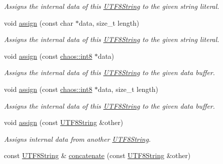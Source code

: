 \begin{DoxyCompactItemize}
\begin{DoxyCompactList}\small\item\em Assigns the internal data of this \hyperlink{classchaos_1_1str_1_1_u_t_f8_string}{U\-T\-F8\-String} to the given string literal. \end{DoxyCompactList}\item 
void \hyperlink{classchaos_1_1str_1_1_u_t_f8_string_a631f935a5b85214a2fa662a78f5693aa}{assign} (const char $\ast$data, size\-\_\-t length)
\begin{DoxyCompactList}\small\item\em Assigns the internal data of this \hyperlink{classchaos_1_1str_1_1_u_t_f8_string}{U\-T\-F8\-String} to the given string literal. \end{DoxyCompactList}\item 
void \hyperlink{classchaos_1_1str_1_1_u_t_f8_string_a861874ab4bff725c9c10b20a14533221}{assign} (const \hyperlink{namespacechaos_a56015674cfe4ad1fc583c3da6c724d8a}{chaos\-::int8} $\ast$data)
\begin{DoxyCompactList}\small\item\em Assigns the internal data of this \hyperlink{classchaos_1_1str_1_1_u_t_f8_string}{U\-T\-F8\-String} to the given data buffer. \end{DoxyCompactList}\item 
void \hyperlink{classchaos_1_1str_1_1_u_t_f8_string_a399d279254a826c36ec8815122ea1883}{assign} (const \hyperlink{namespacechaos_a56015674cfe4ad1fc583c3da6c724d8a}{chaos\-::int8} $\ast$data, size\-\_\-t length)
\begin{DoxyCompactList}\small\item\em Assigns the internal data of this \hyperlink{classchaos_1_1str_1_1_u_t_f8_string}{U\-T\-F8\-String} to the given data buffer. \end{DoxyCompactList}\item 
void \hyperlink{classchaos_1_1str_1_1_u_t_f8_string_aff351b1a6276e5e59717bc6c3b67818c}{assign} (const \hyperlink{classchaos_1_1str_1_1_u_t_f8_string}{U\-T\-F8\-String} \&other)
\begin{DoxyCompactList}\small\item\em Assigns internal data from another \hyperlink{classchaos_1_1str_1_1_u_t_f8_string}{U\-T\-F8\-String}. \end{DoxyCompactList}\item 
const \hyperlink{classchaos_1_1str_1_1_u_t_f8_string}{U\-T\-F8\-String} \& \hyperlink{classchaos_1_1str_1_1_u_t_f8_string_a53b11f980ab48e43df4964945b31f7c7}{concatenate} (const \hyperlink{classchaos_1_1str_1_1_u_t_f8_string}{U\-T\-F8\-String} \&other)

\end{DoxyCompactItemize}
